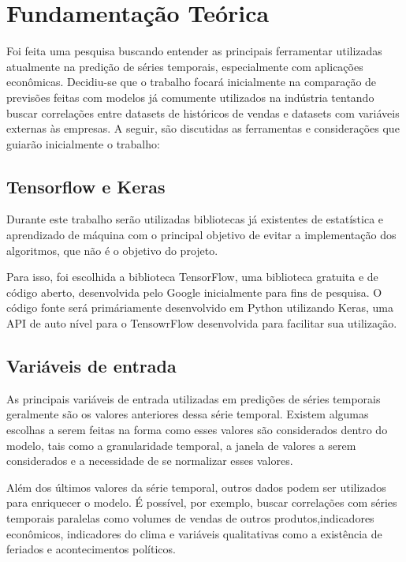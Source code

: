 
\chapter[Fundamentação Teórica]{Fundamentação Teórica}

Foi feita uma pesquisa buscando entender as principais ferramentar utilizadas atualmente na predição de séries temporais, especialmente com aplicações econômicas. Decidiu-se que o trabalho focará inicialmente na comparação de previsões feitas com modelos já comumente utilizados na indústria tentando buscar correlações entre datasets de históricos de vendas e datasets com variáveis externas às empresas. A seguir, são discutidas as ferramentas e considerações que guiarão inicialmente o trabalho:

\section{Tensorflow e Keras}
Durante este trabalho serão utilizadas bibliotecas já existentes de estatística e aprendizado de máquina com o principal objetivo de evitar a implementação dos algoritmos, que não é o objetivo do projeto.

Para isso, foi escolhida a biblioteca TensorFlow, uma biblioteca gratuita e de código aberto, desenvolvida pelo Google inicialmente para fins de pesquisa. O código fonte será primáriamente desenvolvido em Python utilizando Keras, uma API de auto nível para o TensowrFlow desenvolvida para facilitar sua utilização. \cite{keras} \cite{tensorflow}

\section{Variáveis de entrada}
As principais variáveis de entrada utilizadas em predições de séries temporais geralmente são os valores anteriores dessa série temporal. Existem algumas escolhas a serem feitas na forma como esses valores são considerados dentro do modelo, tais como a granularidade temporal, a janela de valores a serem considerados e a necessidade de se normalizar esses valores.

Além dos últimos valores da série temporal, outros dados podem ser utilizados para enriquecer o modelo. É possível, por exemplo, buscar correlações com séries temporais paralelas como volumes de vendas de outros produtos,indicadores econômicos, indicadores do clima e variáveis qualitativas como a existência de feriados e acontecimentos políticos.

